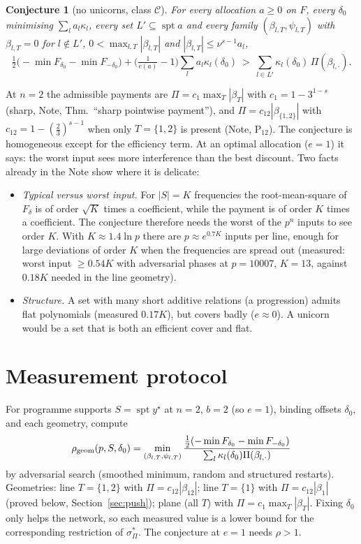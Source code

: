 \documentclass[11pt]{article}
\newtheorem{conjecture}[theorem]{Conjecture}
\theoremstyle{definition}
\begin{document}
\begin{conjecture}[no unicorns, class $\mathcal C$]\label{conj:unicorn}
For every allocation $a\ge0$ on $F$, every $\delta_0$ minimising $\sum_la_l\kappa_l$, every set $L'\subseteq\operatorname{spt}a$ and every family
$(\beta_{l,T},\psi_{l,T})$ with $\beta_{l,T}=0$ for $l\notin L'$, $0<\max_{l,T}|\beta_{l,T}|$ and $|\beta_{l,T}|\le\nu^{s-1}a_l$,
\[\tfrac12\big(-\min F_{\delta_0}-\min F_{-\delta_0}\big)+\big(\tfrac1{e(a)}-1\big)\sum_la_l\kappa_l(\delta_0)\ >\ \sum_{l\in L'}\kappa_l(\delta_0)\,\Pi(\beta_{l,\cdot}).\]
\end{conjecture}
At $n=2$ the admissible payments are $\Pi=c_1\max_T|\beta_T|$ with $c_1=1-3^{1-s}$ (sharp, Note, Thm.\ ``sharp pointwise payment''),
and $\Pi=c_{12}|\beta_{\{1,2\}}|$ with $c_{12}=1-(\frac23)^{s-1}$ when only $T=\{1,2\}$ is present (Note, P$_{12}$).  The conjecture is homogeneous
except for the efficiency term.  At an optimal allocation ($e=1$) it says: the worst input sees more interference than the best discount.
Two facts already in the Note show where it is delicate:
\begin{itemize}
\item \emph{Typical versus worst input.}  For $|S|=K$ frequencies the root-mean-square of $F_\delta$ is of order $\sqrt K$ times a coefficient, while
the payment is of order $K$ times a coefficient.  The conjecture therefore needs the worst of the $p^n$ inputs to see order $K$.  With
$K\approx1.4\ln p$ there are $p\approx e^{0.7K}$ inputs per line, enough for large deviations of order $K$ when the frequencies are spread out
(measured: worst input $\ge0.54K$ with adversarial phases at $p=10007$, $K=13$, against $0.18K$ needed in the line geometry).
\item \emph{Structure.}  A set with many short additive relations (a progression) admits flat polynomials (measured $0.17K$), but covers
badly ($e\approx0$).  A unicorn would be a set that is both an efficient cover and flat.
\end{itemize}

\section{Measurement protocol}
For programme supports $S=\operatorname{spt}y^\star$ at $n=2$, $b=2$ (so $e=1$), binding offsets $\delta_0$, and each geometry, compute
\[\rho_{\rm geom}(p,S,\delta_0)=\min_{(\beta_{l,T},\psi_{l,T})}\frac{\frac12(-\min F_{\delta_0}-\min F_{-\delta_0})}{\sum_{l}\kappa_l(\delta_0)\Pi(\beta_{l,\cdot})}\]
by adversarial search (smoothed minimum, random and structured restarts).  Geometries: line $T=\{1,2\}$ with $\Pi=c_{12}|\beta_{12}|$; line
$T=\{1\}$ with $\Pi=c_{12}|\beta_1|$ (proved below, Section~\ref{sec:push}); plane (all $T$) with $\Pi=c_1\max_T|\beta_T|$.  Fixing $\delta_0$
only helps the network, so each measured value is a lower bound for the corresponding restriction of $\sigma^*_\Pi$.  The conjecture at $e=1$
needs $\rho>1$.
\end{document}
